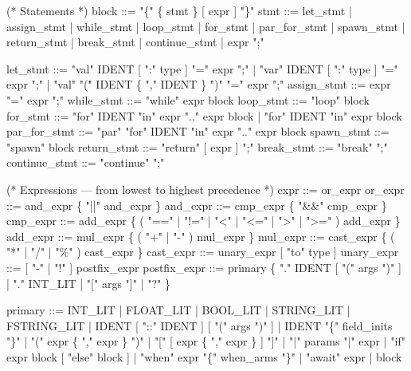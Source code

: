 \documentclass[
  english,
]{book}
\newenvironment{Shaded}{\begin{snugshade}}{\end{snugshade}}
\newcommand{\NormalTok}[1]{\textcolor[rgb]{0.83,0.83,0.83}{#1}}
\begin{document}
\begin{Shaded}
\begin{Highlighting}[]
\NormalTok{(* Statements *)}
\NormalTok{block       ::= "\{" \{ stmt \} [ expr ] "\}"}
\NormalTok{stmt        ::= let\_stmt}
\NormalTok{              | assign\_stmt}
\NormalTok{              | while\_stmt}
\NormalTok{              | loop\_stmt}
\NormalTok{              | for\_stmt}
\NormalTok{              | par\_for\_stmt}
\NormalTok{              | spawn\_stmt}
\NormalTok{              | return\_stmt}
\NormalTok{              | break\_stmt}
\NormalTok{              | continue\_stmt}
\NormalTok{              | expr ";"}

\NormalTok{let\_stmt    ::= "val" IDENT [ ":" type ] "=" expr ";"}
\NormalTok{              | "var" IDENT [ ":" type ] "=" expr ";"}
\NormalTok{              | "val" "(" IDENT \{ "," IDENT \} ")" "=" expr ";"}
\NormalTok{assign\_stmt ::= expr "=" expr ";"}
\NormalTok{while\_stmt  ::= "while" expr block}
\NormalTok{loop\_stmt   ::= "loop" block}
\NormalTok{for\_stmt    ::= "for" IDENT "in" expr ".." expr block}
\NormalTok{              | "for" IDENT "in" expr block}
\NormalTok{par\_for\_stmt ::= "par" "for" IDENT "in" expr ".." expr block}
\NormalTok{spawn\_stmt  ::= "spawn" block}
\NormalTok{return\_stmt ::= "return" [ expr ] ";"}
\NormalTok{break\_stmt  ::= "break" ";"}
\NormalTok{continue\_stmt ::= "continue" ";"}

\NormalTok{(* Expressions — from lowest to highest precedence *)}
\NormalTok{expr        ::= or\_expr}
\NormalTok{or\_expr     ::= and\_expr \{ "||" and\_expr \}}
\NormalTok{and\_expr    ::= cmp\_expr \{ "\&\&" cmp\_expr \}}
\NormalTok{cmp\_expr    ::= add\_expr \{ ( "==" | "!=" | "\textless{}" | "\textless{}=" | "\textgreater{}" | "\textgreater{}=" ) add\_expr \}}
\NormalTok{add\_expr    ::= mul\_expr \{ ( "+" | "{-}" ) mul\_expr \}}
\NormalTok{mul\_expr    ::= cast\_expr \{ ( "*" | "/" | "\%" ) cast\_expr \}}
\NormalTok{cast\_expr   ::= unary\_expr [ "to" type ]}
\NormalTok{unary\_expr  ::= [ "{-}" | "!" ] postfix\_expr}
\NormalTok{postfix\_expr ::= primary \{ "." IDENT [ "(" args ")" ] | "." INT\_LIT | "[" args "]" | "?" \}}

\NormalTok{primary     ::= INT\_LIT}
\NormalTok{              | FLOAT\_LIT}
\NormalTok{              | BOOL\_LIT}
\NormalTok{              | STRING\_LIT}
\NormalTok{              | FSTRING\_LIT}
\NormalTok{              | IDENT [ "::" IDENT ] [ "(" args ")" ]}
\NormalTok{              | IDENT "\{" field\_inits "\}"}
\NormalTok{              | "(" expr \{ "," expr \} ")"}
\NormalTok{              | "[" [ expr \{ "," expr \} ] "]"}
\NormalTok{              | "|" params "|" expr}
\NormalTok{              | "if" expr block [ "else" block ]}
\NormalTok{              | "when" expr "\{" when\_arms "\}"}
\NormalTok{              | "await" expr}
\NormalTok{              | block}


\end{Highlighting}
\end{Shaded}
\end{document}
